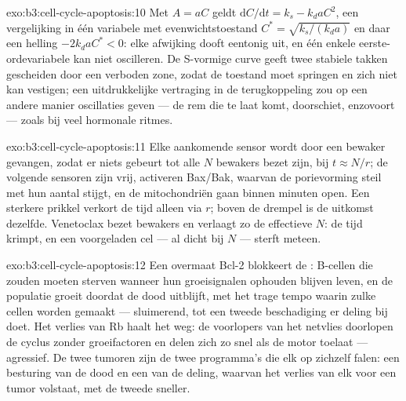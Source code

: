 \begin{solution}{exo:b3:cell-cycle-apoptosis:10}
Met $A = aC$ geldt $\mathrm{d}C/\mathrm{d}t = k_{s} - k_{d}aC^{2}$, een
vergelijking in één variabele met evenwichtstoestand
$C^{*} = \sqrt{k_{s}/(k_{d}a)}$ en daar een helling
$-2k_{d}aC^{*} < 0$: elke afwijking dooft eentonig uit, en één enkele
eerste-ordevariabele kan niet oscilleren. De S-vormige curve geeft twee
stabiele takken gescheiden door een verboden zone, zodat de toestand
moet springen en zich niet kan vestigen; een uitdrukkelijke vertraging
in de terugkoppeling zou op een andere manier oscillaties geven --- de
rem die te laat komt, doorschiet, enzovoort --- zoals bij veel hormonale
ritmes.
\end{solution}

\begin{solution}{exo:b3:cell-cycle-apoptosis:11}
Elke aankomende sensor wordt door een bewaker gevangen, zodat er niets
gebeurt tot alle $N$ bewakers bezet zijn, bij $t \approx N/r$; de
volgende sensoren zijn vrij, activeren Bax/Bak, waarvan de porievorming
steil met hun aantal stijgt, en de mitochondriën gaan binnen minuten
open. Een sterkere prikkel verkort de tijd alleen via $r$; boven de
drempel is de uitkomst dezelfde. Venetoclax bezet bewakers en verlaagt
zo de effectieve $N$: de tijd krimpt, en een voorgeladen cel --- al
dicht bij $N$ --- sterft meteen.
\end{solution}

\begin{solution}{exo:b3:cell-cycle-apoptosis:12}
Een overmaat Bcl-2 blokkeert de : B-cellen die zouden
moeten sterven wanneer hun groeisignalen ophouden blijven leven, en de
populatie groeit doordat de dood uitblijft, met het trage tempo waarin
zulke cellen worden gemaakt --- sluimerend, tot een tweede beschadiging
er deling bij doet. Het verlies van Rb haalt het  weg: de
voorlopers van het netvlies doorlopen de cyclus zonder groeifactoren en
delen zich zo snel als de motor toelaat --- agressief. De twee tumoren
zijn de twee programma's die elk op zichzelf falen: een besturing van
de dood en een van de deling, waarvan het verlies van elk voor een
tumor volstaat, met de tweede sneller.
\end{solution}

